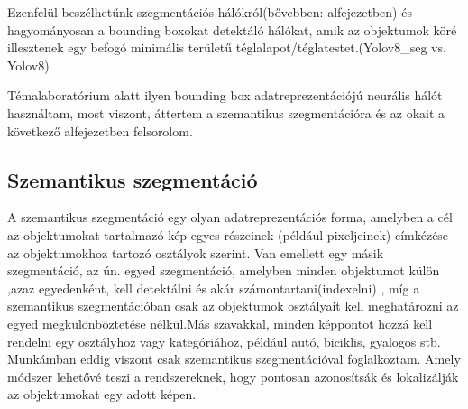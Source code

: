 \documentclass[12pt,oneside,a4paper]{article}
\theoremstyle{remark}
\begin{document}
    Ezenfelül beszélhetűnk szegmentációs hálókról(bővebben:  alfejezetben) és
    hagyományosan a bounding boxokat detektáló hálókat, amik az objektumok köré illesztenek egy befogó minimális területű téglalapot/téglatestet.(Yolov8\_seg vs. Yolov8)

    Témalaboratórium alatt ilyen bounding box adatreprezentációjú neurális hálót használtam, most viszont, áttertem a szemantikus szegmentációra és az okait a következő alfejezetben felsorolom.
\newpage

\subsection{Szemantikus szegmentáció}\label{subsec:szemantikus-szegmentacio}

A szemantikus szegmentáció egy olyan adatreprezentációs forma, amelyben a cél az objektumokat tartalmazó kép egyes
részeinek (például pixeljeinek) címkézése az objektumokhoz tartozó osztályok szerint.
Van emellett egy másik szegmentáció, az ún. egyed szegmentáció, amelyben minden objektumot külön ,azaz egyedenként, kell detektálni és akár számontartani(indexelni) , míg a szemantikus
szegmentációban csak az objektumok osztályait kell meghatározni az egyed megkülönböztetése nélkül.Más szavakkal, minden képpontot
hozzá kell rendelni egy osztályhoz vagy kategóriához, például autó, biciklis, gyalogos stb.
Munkámban eddig viszont csak szemantikus szegmentációval foglalkoztam.
Amely módszer lehetővé teszi a  rendszereknek, hogy pontosan azonosítsák és lokalizálják az
objektumokat egy adott képen.
\end{document}
